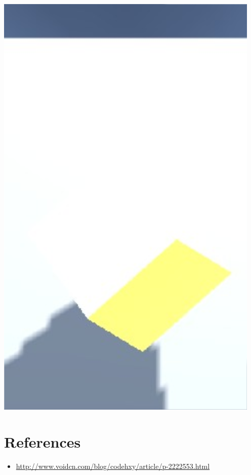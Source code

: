 \documentclass{article}
\begin{document}
\includegraphics[width=.9\linewidth]{./Screenshot_2016-05-02-12-21-12.png}

\section{References}
\label{sec-2}
\begin{itemize}
\item \url{http://www.voidcn.com/blog/codehxy/article/p-2222553.html}
\end{itemize}
\end{document}
